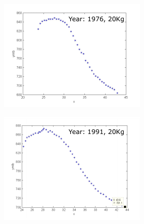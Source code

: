 \begin{figure}[]
    \centering
    \begin{subfigure}{0.45\textwidth}
        \centering
        \includegraphics[width=\linewidth]{Chapters/2CHP/Diagrams/g1line.pdf}
        \caption{}
        \label{subfig:g1lines}
    \end{subfigure}
    \begin{subfigure}{0.45\textwidth}
        \centering
        \includegraphics[width=\linewidth]{Chapters/2CHP/Diagrams/g2line.pdf}
        \caption{}
        \label{subfig:g2lines}
    \end{subfigure}
    \begin{subfigure}{0.45\textwidth}

\end{subfigure}
\end{figure}
